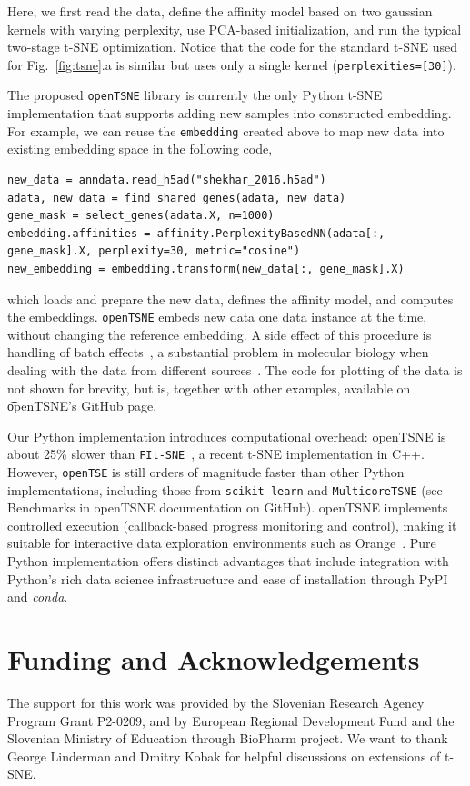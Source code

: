 \documentclass{bioinfo}
\begin{document}
\noindent Here, we first read the data, define the affinity model based on two gaussian kernels with varying perplexity, use PCA-based initialization, and run the typical two-stage t-SNE optimization. Notice that the code for the standard t-SNE used for Fig.~\ref{fig:tsne}.a is similar but uses only a single kernel ({\tt perplexities=[30]}).

The proposed {\tt openTSNE} library is currently the only Python t-SNE implementation that supports adding new samples into constructed embedding. For example, we can reuse the {\tt embedding} created above to map new data into existing embedding space in the following code,

\begin{lstlisting}
new_data = anndata.read_h5ad("shekhar_2016.h5ad")
adata, new_data = find_shared_genes(adata, new_data)
gene_mask = select_genes(adata.X, n=1000)
embedding.affinities = affinity.PerplexityBasedNN(adata[:, gene_mask].X, perplexity=30, metric="cosine")
new_embedding = embedding.transform(new_data[:, gene_mask].X)
\end{lstlisting}

\noindent which loads and prepare the new data, defines the affinity model, and computes the embeddings. {\tt openTSNE} embeds new data one data instance at the time, without changing the reference embedding. A side effect of this procedure is handling of batch effects~\cite{Pavlin2019-DS}, a substantial problem in molecular biology when dealing with the data from different sources~\cite{batch-effects}. The code for plotting of the data is not shown for brevity, but is, together with other examples, available on {\t openTSNE}'s GitHub page. 

Our Python implementation introduces computational overhead: openTSNE is about 25\% slower than {\tt FIt-SNE}~\citep{fi_tsne}, a recent t-SNE implementation in C++. However, {\tt openTSE} is still orders of magnitude faster than other Python implementations, including those from {\tt scikit-learn} and {\tt MulticoreTSNE} (see Benchmarks in openTSNE documentation on GitHub). openTSNE implements controlled execution (callback-based progress monitoring and control), making it suitable for interactive data exploration environments such as Orange~\cite{scorange}. Pure Python implementation offers distinct advantages that include integration with Python's rich data science infrastructure and ease of installation through PyPI and {\em conda}.

\section*{Funding and Acknowledgements}
The support for this work was provided by the Slovenian Research Agency Program Grant P2-0209, and by European Regional Development Fund and the Slovenian Ministry of Education through BioPharm project. We want to thank George Linderman and Dmitry Kobak for helpful discussions on extensions of t-SNE.
\end{document}
